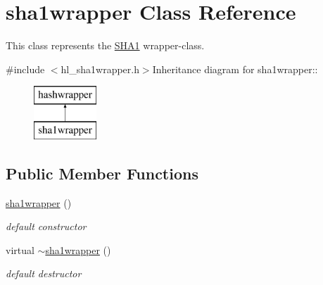 \hypertarget{classsha1wrapper}{
\section{sha1wrapper Class Reference}
\label{classsha1wrapper}
}


This class represents the \hyperlink{class_s_h_a1}{SHA1} wrapper-\/class.  


{\ttfamily \#include $<$hl\_\-sha1wrapper.h$>$}Inheritance diagram for sha1wrapper::\begin{figure}[H]
\begin{center}
\leavevmode
\includegraphics[height=2cm]{classsha1wrapper}
\end{center}
\end{figure}
\subsection*{Public Member Functions}
\begin{DoxyCompactItemize}
\item 
\hyperlink{classsha1wrapper_a7d29b64ac9de33de5e643f9ea83da537}{sha1wrapper} ()
\begin{DoxyCompactList}\small\item\em default constructor \item\end{DoxyCompactList}\item 
virtual \hyperlink{classsha1wrapper_a607cb57d97b3f5b296e1e4dee4294eba}{$\sim$sha1wrapper} ()
\begin{DoxyCompactList}\small\item\em default destructor \item\end{DoxyCompactList}\end{DoxyCompactItemize}
